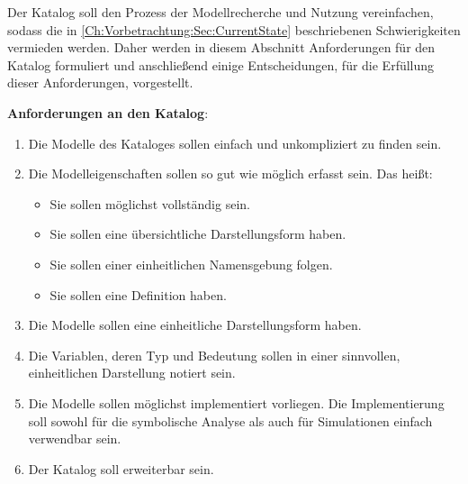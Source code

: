 Der Katalog soll den Prozess der Modellrecherche und Nutzung vereinfachen, sodass die in \autoref{Ch:Vorbetrachtung:Sec:CurrentState} beschriebenen Schwierigkeiten vermieden werden. Daher werden in diesem Abschnitt Anforderungen für den Katalog formuliert und anschließend einige Entscheidungen, für die Erfüllung dieser Anforderungen, vorgestellt.

\textbf{Anforderungen an den Katalog}:
\begin{enumerate}[label=\textbf{Anforderung A.\arabic*}:, ref=\textbf{A.\arabic*}, wide=0pt, leftmargin=*]
	\item \label{A.Findbarkeit}Die Modelle des Kataloges sollen einfach und unkompliziert zu finden sein.
	\item \label{A.Modelleigenschaften}Die Modelleigenschaften sollen so gut wie möglich erfasst sein. Das heißt:
	\begin{itemize}[label=$\bullet$]
		\item Sie sollen möglichst vollständig sein.
		\item Sie sollen eine übersichtliche Darstellungsform haben.
		\item Sie sollen einer einheitlichen Namensgebung folgen.
		\item Sie sollen eine Definition haben.
	\end{itemize}
	\item \label{A.Darstellung_Gleichungen}Die Modelle sollen eine einheitliche Darstellungsform haben.
	\item \label{A.Darstellung_Variablen}Die Variablen, deren Typ und Bedeutung sollen in einer sinnvollen, einheitlichen Darstellung notiert sein.
	\item \label{A.Implementierung}Die Modelle sollen möglichst implementiert vorliegen. Die Implementierung soll sowohl für die symbolische Analyse als auch für Simulationen einfach verwendbar sein.
	\item \label{A.Erweiterbarkeit}Der Katalog soll erweiterbar sein. %
\end{enumerate}

